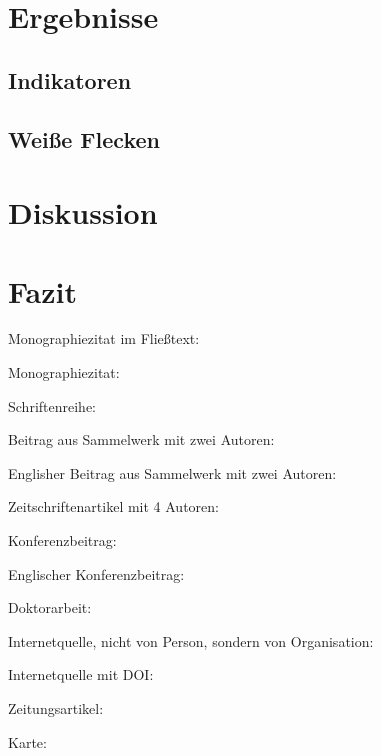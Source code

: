 \documentclass[11pt,a4paper]{scrartcl}
\begin{document}
    
    \section{Ergebnisse}
        \subsection{Indikatoren}
        \subsection{Weiße Flecken} %
        \section{Diskussion}
    \section{Fazit}
        Monographiezitat im Fließtext: \textcite[1]{Buchautor2000}
        
        Monographiezitat: \parencite[1]{Buchautor2000}
        
        Schriftenreihe: \parencite[22]{Schriftenreihler2000}
        
        Beitrag aus Sammelwerk mit zwei Autoren: \parencite[12]{Sammler2000}
        
        Englisher Beitrag aus Sammelwerk mit zwei Autoren: \parencite[12]{Collector2000}
        
        Zeitschriftenartikel mit 4 Autoren: \parencite[11]{Zeitschriftler2000}
        
        Konferenzbeitrag: \parencite[200]{Konferenzler2000}
        
        Englischer Konferenzbeitrag: \parencite[200]{ConferenceGuy2000}
        
        Doktorarbeit: \parencite[12]{Doktor2000}
        
        Internetquelle, nicht von Person, sondern von Organisation: \parencite{Internetorganisation2000}
        
        Internetquelle mit DOI: \parencite{Onlinedoiautor2000}
        
        Zeitungsartikel: \parencite{Kolumna2000}
        
        Karte: \parencite{Kartenorganisation2000}
        
        \printbibliography
    
\end{document}
